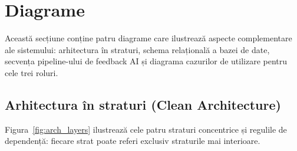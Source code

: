 
\section{Diagrame}
\label{sec:diagrame}

Această secțiune conține patru diagrame care ilustrează aspecte
complementare ale sistemului: arhitectura în straturi, schema relațională
a bazei de date, secvența pipeline-ului de feedback AI și diagrama
cazurilor de utilizare pentru cele trei roluri.


\subsection{Arhitectura în straturi (Clean Architecture)}
\label{subsec:diagrama_arhitectura}

Figura~\ref{fig:arch_layers} ilustrează cele patru straturi concentrice
și regulile de dependență: fiecare strat poate referi exclusiv straturile
mai interioare.

